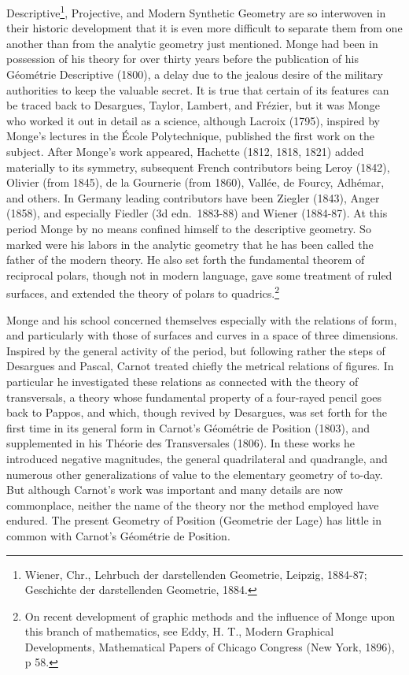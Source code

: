 \documentclass[oneside]{book}
\begin{document}
{Descriptive\footnote{Wiener, Chr., Lehrbuch der darstellenden
Geometrie, Leipzig, 1884-87; Geschichte der darstellenden
Geometrie, 1884.}, Projective, and Modern Synthetic Geometry are so
interwoven in their historic development that it is even more
difficult to separate them from one another than from the analytic
geometry just mentioned. Monge had been in possession of his theory
for over thirty years before the publication of his G\'eom\'etrie
Descriptive (1800), a delay due to the jealous desire of the
military authorities to keep the valuable secret. It is true that
certain of its features can be traced back to Desargues, Taylor,
Lambert, and Fr\'ezier, but it was Monge who worked it out in detail
as a science, although Lacroix (1795), inspired by Monge's lectures
in the \'Ecole Polytechnique, published the first work on the
subject. After Monge's work appeared, Hachette (1812, 1818, 1821)
added materially to its symmetry, subsequent French contributors
being Leroy (1842), Olivier (from 1845), de la Gournerie (from
1860), Vall\'ee, de Fourcy, Adh\'emar, and others. In Germany leading
contributors have been Ziegler (1843), Anger (1858), and especially
Fiedler (3d edn.~1883-88) and Wiener (1884-87). At this period
Monge by no means confined himself to the descriptive geometry. So
marked were his labors in the analytic geometry that he has been
called the father of the modern theory. He also set forth the
fundamental theorem of reciprocal polars, though not in modern
language, gave some treatment of ruled surfaces, and extended the
theory of polars to quadrics.\footnote{On recent development of
graphic methods and the influence of Monge upon this branch of
mathematics, see Eddy, H. T., Modern Graphical Developments,
Mathematical Papers of Chicago Congress (New York, 1896), p 58.}

Monge and his school concerned themselves especially with the
relations of form, and particularly with those of surfaces and
curves in a space of three dimensions. Inspired by the general
activity of the period, but following rather the steps of Desargues
and Pascal, Carnot treated chiefly the metrical relations of
figures. In particular he investigated these relations as connected
with the theory of transversals, a theory whose fundamental property
of a four-rayed pencil goes back to Pappos, and which, though
revived by Desargues, was set forth for the first time in its
general form in Carnot's G\'eom\'etrie de Position (1803), and
supplemented in his Th\'eorie des Transversales (1806). In these
works he introduced negative magnitudes, the general quadrilateral
and quadrangle, and numerous other generalizations of value to the
elementary geometry of to-day. But although Carnot's work was
important and many details are now commonplace, neither the name of
the theory nor the method employed have endured. The present
Geometry of Position (Geometrie der Lage) has little in common with
Carnot's G\'eom\'etrie de Position.

}
\end{document}
